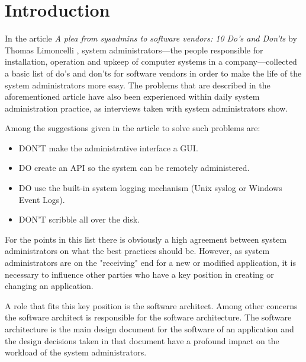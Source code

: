 \section{Introduction} 

In the article \textit{A plea from sysadmins to software vendors: 10 Do's and Don'ts} by Thomas Limoncelli \cite{Limoncelli2011a}, system administrators---the people responsible for installation, operation and upkeep of computer systems in a company---collected a basic list of do's and don'ts for software vendors in order to make the life of the system administrators more easy. The problems that are described in the aforementioned article have also been experienced within daily system administration practice, as interviews taken with system administrators show. 

Among the suggestions given in the article to solve such problems are:
\begin{itemize}
	\item DON'T make the administrative interface a GUI.
	\item DO create an API so the system can be remotely administered.
	\item DO use the built-in system logging mechanism (Unix syslog or Windows Event Logs).
	\item DON'T scribble all over the disk.
\end{itemize}

For the points in this list there is obviously a high agreement between system administrators on what the best practices should be. However, as system administrators are on the "receiving" end for a new or modified application, it is necessary to influence other parties who have a key position in creating or changing an application. 

A role that fits this key position is the software architect. Among other concerns the software architect is responsible for the software architecture. The software architecture is the main design document for the software of an application and the design decisions taken in that document have a profound impact on the workload of the system administrators. 

